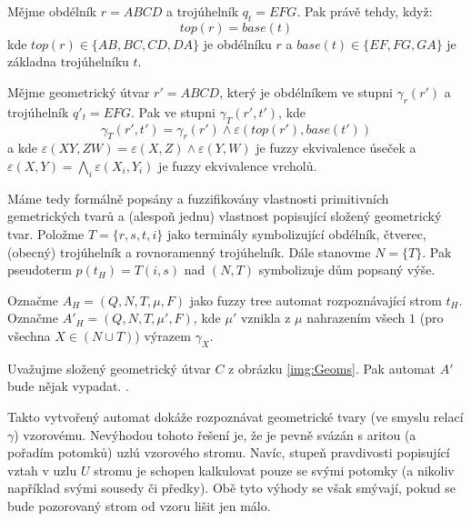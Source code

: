 \documentclass[a4paper,10pt]{article}
\begin{document}
\begin{definition}
 Mějme obdélník $r = A B C D$ a trojúhelník $q_t = E F G$. Pak  právě tehdy, když:
 $$
  top(r) = base(t)
 $$
 kde $top(r) \in \{ AB, BC, CD, DA \}$ je  obdélníku $r$ a $base(t) \in \{ EF, FG, GA \}$ je základna trojúhelníku $t$.
 
 Mějme geometrický útvar $r' = A B C D$, který je obdélníkem ve stupni $\gamma_r(r')$ a trojúhelník $q'_t = E F G$. Pak  ve stupni $\gamma_T(r', t')$, kde
 $$
  \gamma_T(r', t') = \gamma_r(r') \wedge \varepsilon(top(r'), base(t'))
 $$
 a kde $\varepsilon(XY, ZW) = \varepsilon(X, Z) \wedge \varepsilon(Y, W)$ je fuzzy ekvivalence úseček a $\varepsilon(X, Y) = \bigwedge_{i} \varepsilon(X_i, Y_i)$ je fuzzy ekvivalence vrcholů.
\end{definition}

Máme tedy formálně popsány a fuzzifikovány vlastnosti primitivních gemetrických tvarů a (alespoň jednu) vlastnost popisující složený geometrický tvar. Položme $T = \{ r, s, t, i \}$ jako terminály symbolizující obdélník, čtverec, (obecný) trojúhelník a rovnoramenný trojúhelník. Dále stanovme $N = \{ T \}$. Pak pseudoterm $p(t_H) = T(i, s)$ nad $(N, T)$ symbolizuje dům popsaný výše.

Označme $A_H = (Q, N, T, \mu, F)$ jako fuzzy tree automat rozpoznávající strom $t_H$. Označme $A'_H = (Q, N, T, \mu', F)$, kde $\mu'$ vznikla z $\mu$ nahrazením všech $1$ (pro všechna $X \in (N \cup T)$) výrazem $\gamma_X$.

\begin{example}
 Uvažujme složený geometrický útvar $C$ z obrázku \ref{img:Geoms}. Pak automat $A'$ bude nějak vypadat. .
\end{example}

Takto vytvořený automat dokáže rozpoznávat geometrické tvary  (ve smyslu relací $\gamma$) vzorovému. Nevýhodou tohoto řešení je, že je pevně svázán s aritou (a pořadím potomků) uzlú vzorového stromu. Navíc, stupeň pravdivosti popisující vztah v uzlu $U$ stromu je schopen kalkulovat pouze se svými potomky (a nikoliv například svými sousedy či předky). Obě tyto výhody se však smývají, pokud se bude pozorovaný strom od vzoru lišit jen málo.
\end{document}
